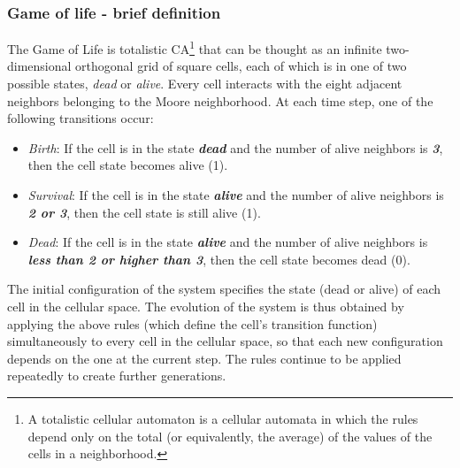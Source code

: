 \subsubsection{Game of life - brief definition} 
The Game of Life is totalistic CA\footnote{A totalistic cellular automaton is a cellular automata in which the rules depend only on the	total (or equivalently, the average) of the values of the cells in a neighborhood.} that can be thought as an infinite two-dimensional orthogonal grid of square cells, each of which is in one of two possible states, \emph{dead} or \emph{alive}. Every cell interacts with the eight adjacent neighbors belonging to the Moore neighborhood. At each time step, one of the following transitions occur:
	\begin{itemize}
	\item \emph{Birth}: If the cell is in the state \textbf{\textit{dead}} and
	the number of alive neighbors is \textbf{\textit{3}}, then the cell state
	becomes alive (1).
	\item \emph{Survival}: If the cell is in the state \textbf{\textit{alive}}
	and the number of alive neighbors is \textbf{\textit{2 or 3}}, then the cell
	state is still alive (1).
	\item \emph{Dead}: If the cell is in the state \textbf{\textit{alive}} and
	the number of alive neighbors is \textbf{\textit{less than 2 or higher
			than 3}}, then the cell state becomes dead (0).
\end{itemize}
The initial configuration of the system specifies the state (dead
or alive) of each cell in the cellular space. The evolution of the
system is thus obtained by applying the above rules (which define
the cell's transition function) simultaneously to every cell in
the cellular space, so that each new configuration depends on the
one at the current step. The rules continue to be applied
repeatedly to create further generations.

